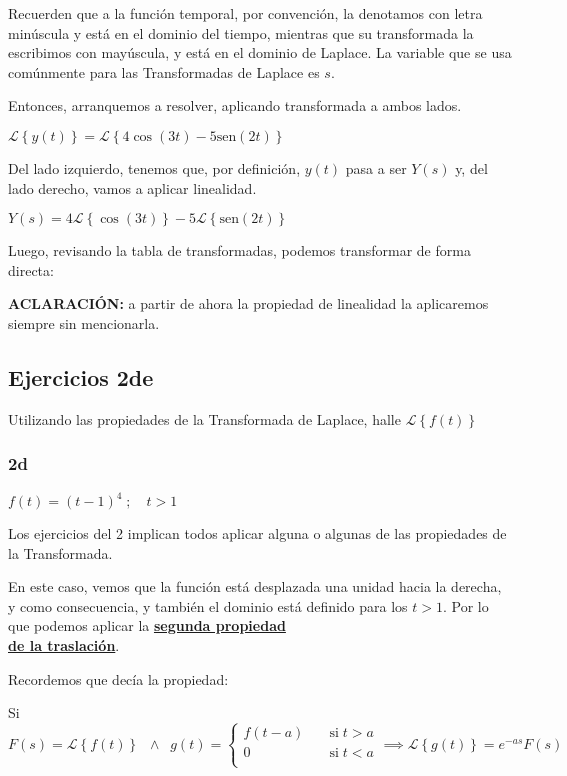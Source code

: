 \documentclass[11pt]{article}
\def\sen{\mathrm{sen}}
\newcommand{\lapl}[1]{\mathscr{L} \left\lbrace {#1} \right\rbrace}
\begin{document}
	Recuerden que a la función temporal, por convención, la denotamos con letra minúscula y está en el dominio del tiempo, mientras que su transformada la escribimos con mayúscula, y está en el dominio de Laplace. La variable que se usa comúnmente para las Transformadas de Laplace es $s$.
	
	Entonces, arranquemos a resolver, aplicando transformada a ambos lados.
	
	$\displaystyle \lapl{y(t)}=\lapl{4\cos\left(3t\right) - 5\sen\left(2t\right)}$
	
	Del lado izquierdo, tenemos que, por definición, $y(t)$ pasa a ser $Y(s)$ y, del lado derecho, vamos a aplicar linealidad.
	
	$\displaystyle Y(s)=4\lapl{\cos\left(3t\right)}-5\lapl{\sen\left(2t\right)}$
	
	Luego, revisando la tabla de transformadas, podemos transformar de forma directa:
	
	
	\textbf{ACLARACIÓN:} a partir de ahora la propiedad de linealidad la aplicaremos siempre sin mencionarla.
	
	\subsection{Ejercicios 2de}
	Utilizando las propiedades de la Transformada de Laplace, halle $\lapl{f(t)}$
	
	\subsubsection{2d}
	$f(t)=\left(t-1\right)^{4}\; ;\quad t>1$
	
	Los ejercicios del 2 implican todos aplicar alguna o algunas de las propiedades de la Transformada.
	
	En este caso, vemos que la función está desplazada una unidad hacia la derecha, y como consecuencia, y también el dominio está definido para los $t>1$. Por lo que podemos aplicar la \textbf{\underline{segunda propiedad}}\\
	\textbf{\underline{de la traslación}}.
	
	Recordemos que decía la propiedad:
	
	Si $ \displaystyle
	F(s)=\lapl{f(t)}\;\; \wedge\;\; 
	g(t) = 
	\begin{cases}
		f(t-a) &\quad\text{si}\; t > a\\
		0 &\quad\text{si}\; t < a \\
	\end{cases}
	\implies \lapl{g(t)}=e^{-as}F(s)$
	
\end{document}
